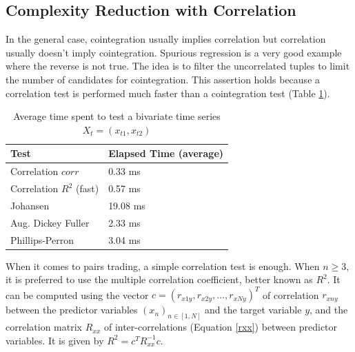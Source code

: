 \documentclass[11pt,a4,twosided,singlespacing,titlepagenumber=on]{scrreprt}
\numberwithin{equation}{chapter} %
\theoremstyle{remark}
\begin{document}
\subsection{Complexity Reduction with Correlation}
\label{Complexity_Reduction_with_Correlation}
In the general case, cointegration usually implies correlation but correlation usually doesn't imply cointegration. Spurious regression is a very good example where the reverse is not true. The idea is to filter the uncorrelated tuples to limit the number of candidates for cointegration. This assertion holds because a correlation test is performed much faster than a cointegration test (Table \ref{time_spent_test_bivariate}).

\begin{table}[H]
\centering
\begin{tabular}{ll}
\hline
\multicolumn{1}{|l|}{Test}     & \multicolumn{1}{l|}{Elapsed Time (average)} \\ \hline
Correlation $corr$						 &  0.33 ms \\
Correlation $R^2$ (fast)       &  0.57 ms \\
Johansen                       &  19.08 ms\\
Aug. Dickey Fuller             &  2.33 ms\\
Phillips-Perron                &  3.04 ms\\
\hline
\end{tabular}
\caption{Average time spent to test a bivariate time series $X_t = (x_{t1}, x_{t2})$}
\label{time_spent_test_bivariate}
\end{table}

When it comes to pairs trading, a simple correlation test is enough. When $n \geq 3$, it is preferred to use the multiple correlation coefficient, better known as $R^2$. It can be computed using the vector $c = (r_{x1y}, r_{x2y},...,r_{xNy})^T$ of correlation $r_{xny}$ between the predictor variables $(x_n)_{n \in [1,N]}$ and the target variable $y$, and the correlation matrix $R_{xx}$ of inter-correlations (Equation \ref{rxx}) between predictor variables. It is given by $R^2 = c^T R_{xx}^{-1}c$.
\end{document}

